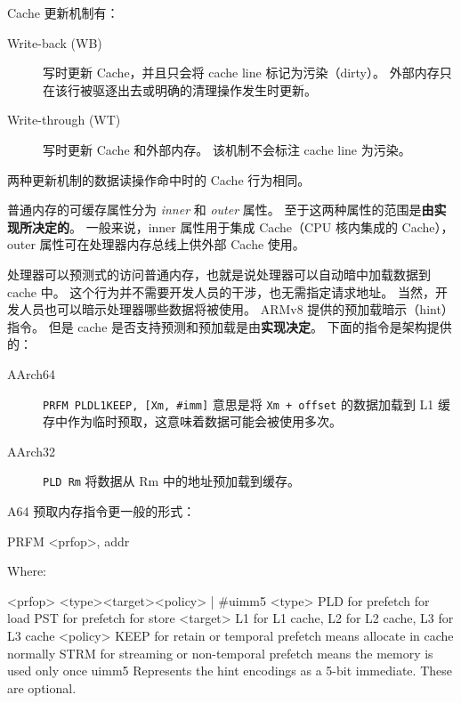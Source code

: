 Cache 更新机制有：

\begin{description}
  \item[Write-back (WB)] 写时更新 Cache，并且只会将 cache line 标记为污染（dirty）。
    外部内存只在该行被驱逐出去或明确的清理操作发生时更新。
  
  \item[Write-through (WT)] 写时更新 Cache 和外部内存。
    该机制不会标注 cache line 为污染。
\end{description}

两种更新机制的数据读操作命中时的 Cache 行为相同。

普通内存的可缓存属性分为 \textit{inner} 和 \textit{outer} 属性。
至于这两种属性的范围是\textbf{由实现所决定的}。
一般来说，inner 属性用于集成 Cache（CPU 核内集成的 Cache），outer 属性可在处理器内存总线上供外部 Cache 使用。


处理器可以预测式的访问普通内存，也就是说处理器可以自动暗中加载数据到 cache 中。
这个行为并不需要开发人员的干涉，也无需指定请求地址。
当然，开发人员也可以暗示处理器哪些数据将被使用。
ARMv8 提供的预加载暗示（hint）指令。
但是 cache 是否支持预测和预加载是由\textbf{实现决定}。
下面的指令是架构提供的：

\begin{description}
  \item[AArch64] \lstinline!PRFM PLDL1KEEP, [Xm, #imm]! 意思是将 \lstinline!Xm + offset! 的数据加载到 L1 缓存中作为临时预取，这意味着数据可能会被使用多次。
  \item[AArch32] \lstinline!PLD Rm! 将数据从 Rm 中的地址预加载到缓存。
\end{description}

A64 预取内存指令更一般的形式：

\begin{lstcode}
  PRFM <prfop>, addr

  Where:

  <prfop>     <type><target><policy> | #uimm5
  <type>      PLD for prefetch for load
              PST for prefetch for store
  <target>    L1 for L1 cache, L2 for L2 cache, L3 for L3 cache
  <policy>    KEEP for retain or temporal prefetch means allocate in cache
              normally
              STRM for streaming or non-temporal prefetch means the memory
              is used only once
  uimm5       Represents the hint encodings as a 5-bit immediate.
              These are optional.
\end{lstcode}

